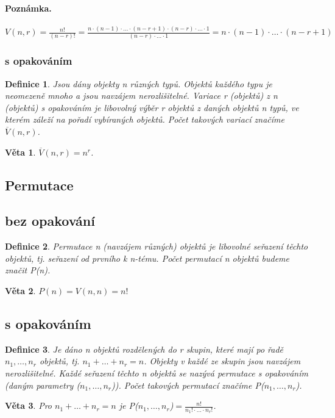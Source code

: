 \documentclass[12pt,a4paper]{article}
\newtheorem{definition}{Definice}
\newtheorem{sentence}{Věta}
\begin{document}
\paragraph{Poznámka.} $V(n, r) = \frac{n!}{(n - r)!} = \frac{n \cdot (n - 1) \cdot \dots \cdot (n - r + 1) \cdot (n - r) \cdot \dots \cdot 1}{(n - r) \cdot \dots \cdot 1} = n \cdot (n - 1) \cdot \dots \cdot (n - r + 1)$

\subsubsection{s opakováním}
\begin{definition}
	Jsou dány objekty n různých typů. Objektů každého typu je neomezeně mnoho a jsou navzájem nerozlišitelné. Variace r (objektů) z n (objektů) s opakováním je libovolný výběr r objektů z daných objektů n typů, ve kterém záleží na pořadí vybíraných objektů. Počet takových variací značíme $\overline{V}(n, r)$.	
\end{definition}
\begin{sentence}
	$\overline{V}(n, r) = n^r$.
\end{sentence}

\subsection{Permutace}
\subsection{bez opakování}
\begin{definition}
	Permutace n (navzájem různých) objektů je libovolné seřazení těchto objektů, tj. seřazení od prvního k n-tému. Počet permutací n objektů budeme značit P(n).
\end{definition}
\begin{sentence}
	$P(n) = V(n, n) = n!$
\end{sentence}

\subsection{s opakováním}
\begin{definition}
	Je dáno n objektů rozdělených do r skupin, které mají po řadě $n_1, \dots,n_r$ objektů, tj. $n_1 + \dots + n_r = n$. Objekty v každé ze skupin jsou navzájem nerozlišitelné. Každé seřazení těchto n objektů se nazývá permutace s opakováním (daným parametry ($n_1, \dots, n_r$)). Počet takových permutací značíme P($n_1, \dots, n_r$).
\end{definition}
\begin{sentence}
	Pro $n_1 + \dots + n_r = n$ je P($n_1, \dots, n_r$)$ = \frac{n!}{n_1! \cdot \dots \cdot n_r!}$.
\end{sentence}
\end{document}
